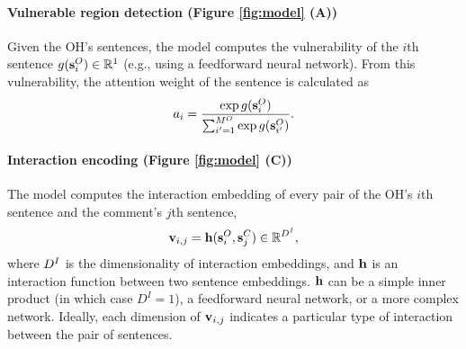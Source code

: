 \documentclass[11pt,a4paper]{article}
\newif\ifcomments
\newcommand{\gn}[1]{\ifcomments\textcolor{red}{\bf\small [#1 --GN]}\else\fi}
\begin{document}
\paragraph{Vulnerable region detection (Figure \ref{fig:model} (A))} Given the OH's sentences, the model computes the vulnerability of the $i$th sentence $g(\mathbf{s}^{O}_i) \in \mathbb{R}^1$ (e.g., using a feedforward neural network).  From this vulnerability, the attention weight of the sentence is calculated as
$$a_i = \frac{\exp g(\mathbf{s}^{O}_i)}{\sum_{i' = 1}^{M^{O}} \exp g(\mathbf{s}^{O}_{i'})}.$$

\paragraph{Interaction encoding (Figure \ref{fig:model} (C))} The model computes the interaction embedding of every pair of the OH's $i$th sentence and the comment's $j$th sentence,
$$\mathbf{v}_{i,j} = \mathbf{h}(\mathbf{s}^{O}_i, \mathbf{s}^{C}_j) \in \mathbb{R}^{D^{I}},$$
where $D^{I}$ is the dimensionality of interaction embeddings, and $\mathbf{h}$ is an interaction function between two sentence embeddings.  $\mathbf{h}$ can be a simple inner product (in which case $D^I = 1$), 
a feedforward neural network, or a more complex network. Ideally, each dimension of $\mathbf{v}_{i,j}$ indicates a particular type of interaction between the pair of sentences.
\end{document}
